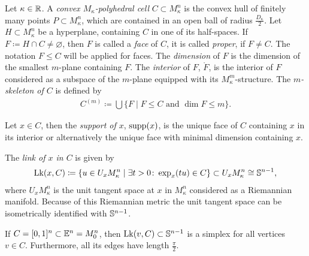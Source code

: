 \begin{defin}
  Let \(\kappa \in \mathbb{R}\). A \emph{convex \(M_\kappa\)-polyhedral cell} \(C \subset M_\kappa^n\) is the convex hull of finitely many points \(P \subset M_\kappa^n\), which are contained in an open ball of radius \(\frac{D_\kappa}{2}\). Let \(H \subset M_\kappa^n\)  be a hyperplane, containing \(C\) in one of its half-spaces. If \(F \coloneqq H \cap C \neq \varnothing\), then \(F\) is called a \emph{face} of \(C\), it is called \emph{proper}, if \(F \neq C\). The notation \(F \leq C\) will be applied for faces. The \emph{dimension} of \(F\) is the dimension of the smallest \(m\)-plane containing \(F\). The \emph{interior} of \(F\), \(\mathring F\), is the interior of \(F\) considered as a subspace of the \(m\)-plane equipped with its \(M_\kappa^m\)-structure. The \emph{\(m\)-skeleton of \(C\)} is defined by
  \begin{align*}
    C^{(m)} \coloneqq \bigcup \{F \mid F \leq C \text{ and } \dim F \leq m\}.
  \end{align*}

  Let \(x \in C\), then the \emph{support of \(x\)}, \(\operatorname{supp}(x)\), is the unique face of \(C\) containing \(x\) in its interior or alternatively the unique face with minimal dimension containing \(x\).

  The \emph{link of \(x\) in \(C\)} is given by
  \begin{align*}
    \operatorname{Lk}(x,C) \coloneqq \{u \in U_xM_\kappa^n \mid \exists t > 0 \colon \exp_x(tu) \in C\} \subset U_xM_\kappa^n \cong \mathbb{S}^{n-1},
  \end{align*}
  where \(U_xM_\kappa^n\) is the unit tangent space at \(x\) in \(M_\kappa^n\) considered as a Riemannian manifold. Because of this Riemannian metric the unit tangent space can be isometrically identified with \(\mathbb{S}^{n-1}\).
\end{defin}

\begin{bsp}
\end{bsp}

\begin{rem}
  If \(C = [0,1]^n \subset \mathbb{E}^n = M_0^n\), then \(\operatorname{Lk}(v,C) \subset \mathbb{S}^{n-1}\) is a simplex for all vertices \(v \in C\). Furthermore, all its edges have length \(\frac{\pi}{2}\).
\end{rem}

